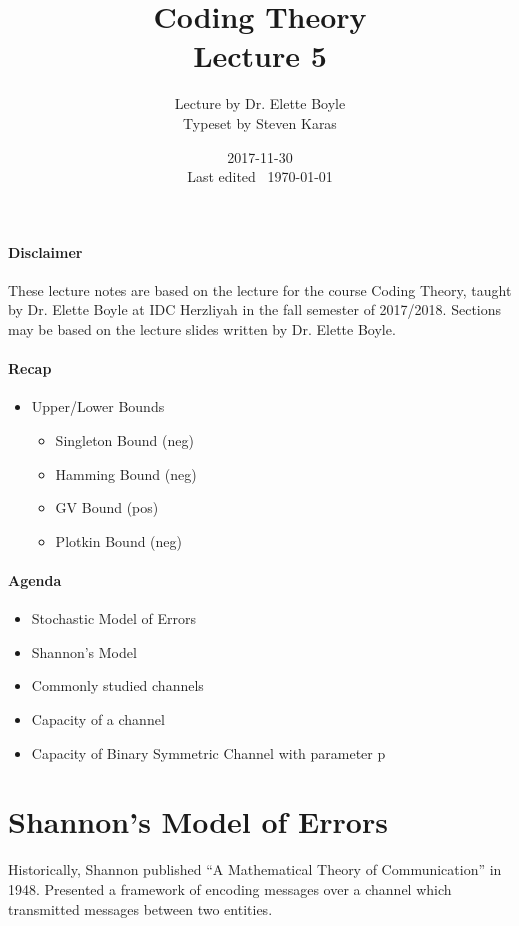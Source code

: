 \documentclass{idc_msc}
\title{Coding Theory\\\large Lecture 5}
\date{2017-11-30 \\ Last edited \currenttime\ \today}
\author{Lecture by Dr. Elette Boyle\\Typeset by Steven Karas}
\begin{document}
\maketitle

\paragraph{Disclaimer}

These lecture notes are based on the lecture for the course Coding Theory, taught by Dr. Elette Boyle at IDC Herzliyah in the fall semester of 2017/2018.
Sections may be based on the lecture slides written by Dr. Elette Boyle.

\paragraph{Recap}

\begin{itemize}
  \item Upper/Lower Bounds
  \begin{itemize}
    \item Singleton Bound (neg)
    \item Hamming Bound (neg)
    \item GV Bound (pos)
    \item Plotkin Bound (neg)
  \end{itemize}
\end{itemize}


\paragraph{Agenda}

\begin{itemize}
  \item Stochastic Model of Errors
  \item Shannon's Model
  \item Commonly studied channels
  \item Capacity of a channel
  \item Capacity of Binary Symmetric Channel with parameter p
\end{itemize}

\section{Shannon's Model of Errors}

Historically, Shannon published ``A Mathematical Theory of Communication'' in 1948.
Presented a framework of encoding messages over a channel which transmitted messages between two entities.
\end{document}
